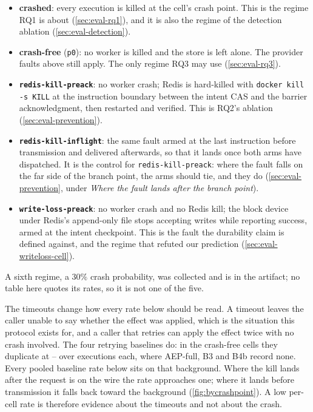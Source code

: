 \begin{itemize}
\item \textbf{crashed}: every execution is killed at the cell's crash point.
      This is the regime RQ1 is about (\cref{sec:eval-rq1}), and it is also
      the regime of the detection ablation (\cref{sec:eval-detection}).
\item \textbf{crash-free} (\texttt{p0}): no worker is killed and the store is
      left alone. The provider faults above still apply. The only regime RQ3
      may use (\cref{sec:eval-rq3}).
\item \textbf{\texttt{redis-kill-preack}}: no worker crash; Redis is hard-killed
      with \texttt{docker kill -s KILL} at the instruction boundary between the
      intent CAS and the barrier acknowledgment, then restarted and verified.
      This is RQ2's ablation (\cref{sec:eval-prevention}).
\item \textbf{\texttt{redis-kill-inflight}}: the same fault armed at the last
      instruction before transmission and delivered afterwards, so that it
      lands once both arms have dispatched. It is the control for
      \texttt{redis-kill-preack}: where the fault falls on the far side of the
      branch point, the arms should tie, and they do
      (\cref{sec:eval-prevention}, under \emph{Where the fault lands after the
      branch point}).
\item \textbf{\texttt{write-loss-preack}}: no worker crash and no Redis kill;
      the block device under Redis's append-only file stops accepting writes
      while reporting success, armed at the intent checkpoint. This is the
      fault the durability claim is defined against, and the regime that
      refuted our prediction (\cref{sec:eval-writeloss-cell}).
\end{itemize}

A sixth regime, a $30\%$ crash probability, was collected and is in the
artifact; no table here quotes its rates, so it is not one of the five.

The timeouts change how every rate below should be read. A timeout leaves the
caller unable to say whether the effect was applied, which is the situation
this protocol exists for, and a caller that retries can apply the effect twice
with no crash involved. The four retrying baselines do: in the crash-free
cells they duplicate at \CrashFreeDupLow{}--\CrashFreeDupHigh{} over
\CrashFreeDupExec{} executions each, where AEP-full, B3 and B4b record none.
Every pooled baseline rate below sits on that background. Where the kill lands
after the request is on the wire the rate approaches one; where it lands
before transmission it falls back toward the background
(\cref{fig:bycrashpoint}). A low per-cell rate is therefore evidence about the
timeouts and not about the crash.

